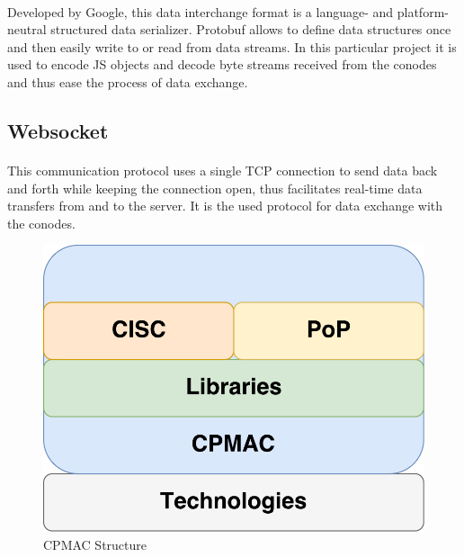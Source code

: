 \paragraph{}
Developed by Google, this data interchange format is a language- and platform-neutral structured data serializer. Protobuf allows to define data structures once and then easily write to or read from data streams. In this particular project it is used to encode JS objects and decode byte streams received from the conodes and thus ease the process of data exchange.

\subsection[Websocket]{Websocket\raisebox{.3\baselineskip}{\normalsize\footnotemark}}

\paragraph{}
This communication protocol uses a single TCP connection to send data back and forth while keeping the connection open, thus facilitates real-time data transfers from and to the server. It is the used protocol for data exchange with the conodes.

\begin{figure}[h]
\includegraphics[scale=.3]{graphic/cpmac.pdf}
\centering
\caption{CPMAC Structure}
\end{figure}
